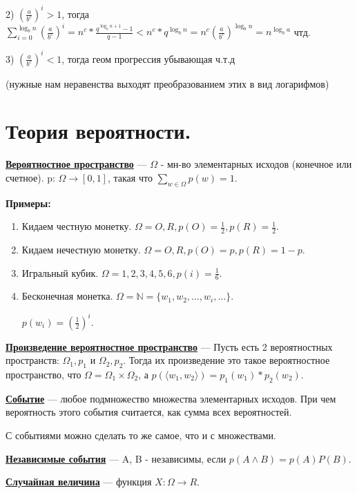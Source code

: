 \documentclass{article}
\newcommand{\deff}[1]{\underline{\textbf{#1}}}
\begin{document}
 2) $(\frac{a}{b^c})^i>1$, тогда $\sum\limits_{i=0}^{\log_bn} (\frac{a}{b^c})^i =n^c * \frac{q^{\log_bn+1}-1}{q-1}<n^c *q^{\log_bn} = n^c (\frac{a}{b^c})^{\log_bn} =n^{\log_ba}$ чтд.

 3) $(\frac{a}{b^c})^i<1$, тогда геом прогрессия убывающая ч.т.д

 (нужные нам неравенства выходят преобразованием этих в вид логарифмов)
 \pagebreak
 \section{Теория вероятности.}

 \deff{Вероятностное пространство} --- $\Omega $ - мн-во элементарных исходов (конечное или счетное). p: $\Omega \rightarrow [0,1]$, такая что
 $\sum\limits_{w \in \Omega}p(w) = 1$.

 \textbf{Примеры:}

\begin{enumerate}
    

 \item  Кидаем честную монетку. $\Omega = {O,R}, p(O)=\frac{1}{2}, p(R)=\frac{1}{2}$.

 \item Кидаем нечестную монетку. $\Omega = {O,R}, p(O)=p, p(R)=1-p$.

 \item Игральный кубик. $\Omega = {1,2,3,4,5,6}, p(i)=\frac{1}{6}$.

 \item Бесконечная монетка. $\Omega = \mathbb{N} =\{w_1,w_2,\ldots,w_i,\ldots\}$.

 $p(w_i)=(\frac{1}{2})^i$.
 \end{enumerate}

\deff{Произведение вероятностное пространство} --- Пусть есть 2 вероятностных пространств: $\Omega_1, p_1$ и $\Omega_2, p_2$. Тогда их произведение это такое вероятностное пространство, что $\Omega = \Omega_1 \times \Omega_2$, а $p(\langle w_1,w_2 \rangle) = p_1(w_1) * p_2(w_2)$.

\deff{Событие} --- любое подмножество множества  элементарных исходов. При чем вероятность этого события считается, как сумма всех вероятностей.

С событиями можно сделать то же самое, что и с множествами.

\deff{Независимые события} --- A, B - независимы, если $p(A \wedge B) = p(A) P(B)$.

\deff{Случайная величина} --- функция $X: \Omega \rightarrow R$.
\end{document}
